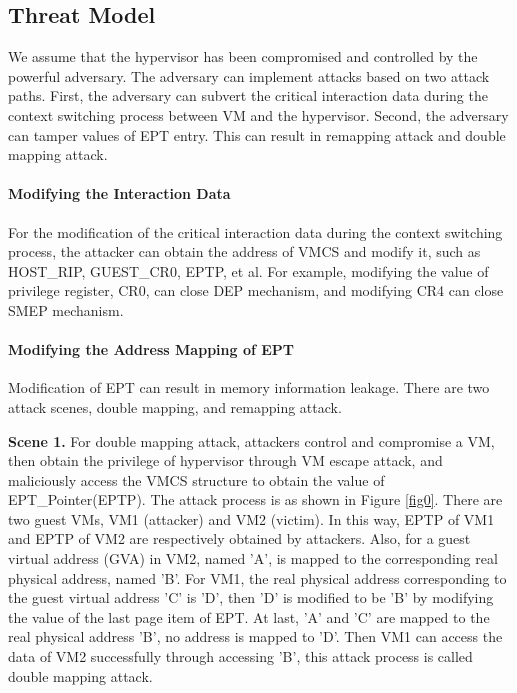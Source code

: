 \documentclass[conference]{IEEEtran}
\begin{document}
\subsection{Threat Model} \label {threat}



We assume that the hypervisor has been compromised and controlled by the powerful adversary. The adversary can implement attacks based on two attack paths. 
First, the adversary can subvert the critical interaction data during the context switching process between VM and the hypervisor. Second, the adversary can tamper values of EPT entry. This can result in remapping attack and double mapping attack.

\paragraph{Modifying the Interaction Data}
For the modification of the critical interaction data during the context switching process, the attacker can obtain the address of VMCS
and modify it, such as HOST\_RIP, GUEST\_CR0, EPTP, et al. For example,
modifying the value of privilege register, CR0, can close DEP mechanism, and modifying CR4 can close SMEP mechanism.

\paragraph{Modifying the Address Mapping of EPT}
Modification of EPT can result in memory information leakage. There are two attack scenes, double mapping, and remapping attack.

\textbf{Scene 1.} 
    For double mapping attack, attackers control and compromise a VM, then obtain the privilege of hypervisor through VM escape attack, and maliciously access the VMCS structure to obtain the value of EPT\_Pointer(EPTP). The attack process is as shown in Figure \ref{fig0}. There are two guest VMs, VM1 (attacker) and VM2 (victim). In this way, EPTP of VM1 and EPTP of VM2 are respectively obtained by attackers. Also, for a guest virtual address (GVA) in VM2, named 'A', is mapped to the corresponding real physical address, named 'B'. For VM1, the real physical address corresponding to the guest virtual address 'C' is 'D', then 'D' is modified to be 'B' by modifying the value of the last page item of EPT. At last, 'A' and 'C' are mapped to the real physical address 'B', no address is mapped to 'D'. Then VM1 can access the data of VM2 successfully through accessing 'B', this attack process is called double mapping attack.
\end{document}
